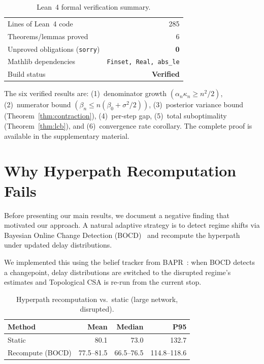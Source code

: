 \documentclass[journal]{IEEEtran}
\begin{document}
\begin{table}[t]
\centering
\caption{Lean~4 formal verification summary.}
\label{tab:lean}
\begin{tabular}{lr}
\toprule
Lines of Lean~4 code & 285 \\
Theorems/lemmas proved & 6 \\
Unproved obligations (\texttt{sorry}) & \textbf{0} \\
Mathlib dependencies & \texttt{Finset, Real, abs\_le} \\
Build status & \textbf{Verified} \\
\bottomrule
\end{tabular}
\end{table}

The six verified results are: (1)~denominator growth $(\alpha_n\kappa_n \geq n^2/2)$, (2)~numerator bound $(\beta_n \leq n(\beta_0 + \sigma^2/2))$, (3)~posterior variance bound (Theorem~\ref{thm:contraction}), (4)~per-step gap, (5)~total suboptimality (Theorem~\ref{thm:lcb}), and (6)~convergence rate corollary. The complete proof is available in the supplementary material.

\section{Why Hyperpath Recomputation Fails}
\label{sec:recomp}

Before presenting our main results, we document a negative finding that motivated our approach. A natural adaptive strategy is to detect regime shifts via Bayesian Online Change Detection (BOCD)~\cite{adams2007} and recompute the hyperpath under updated delay distributions.

We implemented this using the belief tracker from BAPR~\cite{bapr2024}: when BOCD detects a changepoint, delay distributions are switched to the disrupted regime's estimates and Topological CSA is re-run from the current stop.

\begin{table}[t]
\centering
\caption{Hyperpath recomputation vs.\ static (large network, disrupted).}
\label{tab:recomp}
\begin{tabular}{lrrr}
\toprule
Method & Mean & Median & P95 \\
\midrule
Static & 80.1 & 73.0 & 132.7 \\
Recompute (BOCD) & 77.5--81.5 & 66.5--76.5 & 114.8--118.6 \\
\bottomrule
\end{tabular}
\end{table}
\end{document}
